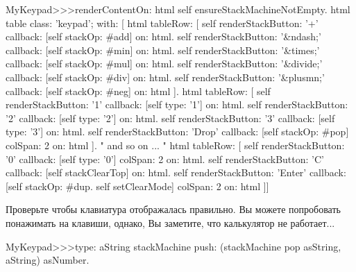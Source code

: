 \documentclass[a4paper,10pt,twoside]{book}
\begin{document}
\begin{code}{}
MyKeypad>>>renderContentOn: html 
  self ensureStackMachineNotEmpty.
  html table
    class: 'keypad';
    with: [
      html tableRow: [
          self renderStackButton: '+' callback: [self stackOp: #add] on: html.
          self renderStackButton: '&ndash;' callback: [self stackOp: #min] on: html.
          self renderStackButton: '&times;' callback: [self stackOp: #mul] on: html.
          self renderStackButton: '&divide;' callback: [self stackOp: #div] on: html.
          self renderStackButton: '&plusmn;' callback: [self stackOp: #neg] on: html ].
        html tableRow: [
          self renderStackButton: '1' callback: [self type: '1'] on: html.
          self renderStackButton: '2' callback: [self type: '2'] on: html.
          self renderStackButton: '3' callback: [self type: '3'] on: html.
          self renderStackButton: 'Drop' callback: [self stackOp: #pop]
          	colSpan: 2 on: html ].
" and so on ... "
        html tableRow: [
          self renderStackButton: '0' callback: [self type: '0'] colSpan: 2 on: html.
          self renderStackButton: 'C' callback: [self stackClearTop] on: html.
          self renderStackButton: 'Enter'
          	callback: [self stackOp: #dup. self setClearMode]
			colSpan: 2 on: html ]]
\end{code}


Проверьте чтобы клавиатура отображалась правильно.
Вы можете попробовать понажимать на клавиши, однако, Вы заметите,
что калькулятор не работает...



\begin{code}{}
MyKeypad>>>type: aString
	stackMachine push: (stackMachine pop asString, aString) asNumber.
\end{code}

\end{document}
